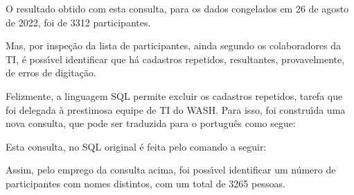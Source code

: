\documentclass[
12pt,		%
openright,	%
twoside,  %
a4paper,			%
chapter=TITLE,		%
english,			%
french,				%
spanish,			%
brazil				%
]{USPSC-classe/USPSC_RedarTex}
\begin{document}
O resultado obtido com esta consulta, para os dados congelados em 26 de agosto de 2022, foi de 3312 participantes.








Mas, por inspe\c{c}\~ao da lista de participantes, ainda segundo os colaboradores da TI, \'e poss\'{\i}vel identificar que h\'a cadastros repetidos, resultantes, provavelmente, de erros de digita\c{c}\~ao.








Felizmente, a linguagem SQL permite excluir os cadastros repetidos, tarefa que foi delegada \`a prestimosa equipe de TI do WASH. Para isso, foi constru\'{\i}da uma nova consulta, que pode ser traduzida para o portugu\^es como segue:









\noindent\begin{center}\mbox{\centering{}}\end{center}











Esta consulta, no SQL original \'e feita pelo comando a seguir:









\noindent\begin{center}\mbox{\centering{}}\end{center}











Assim, pelo emprego da consulta acima, foi poss\'{\i}vel identificar um n\'umero de participantes com nomes distintos, com um total de 3265 pessoas.
\end{document}
